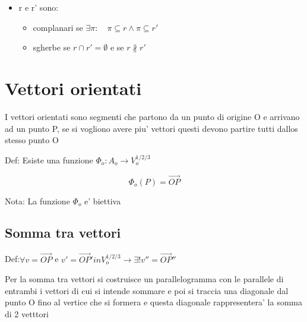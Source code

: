 \documentclass{article}
\begin{document}
\begin{itemize}
\begin{itemize}
\begin{itemize}
		            \end{itemize}
		      \item r e r' sono:
		            \begin{itemize}
			            \item complanari se $\exists \pi: \quad \pi \subseteq r \land \pi \subseteq r'$
			            \item sgherbe se $r \cap r' = \emptyset$ e se $r \nparallel r'$
		            \end{itemize}
	      \end{itemize}
\end{itemize}

\section{Vettori orientati}
\begin{flushleft}
	I vettori orientati sono segmenti che partono da un punto di origine O e arrivano ad un punto P, se si vogliono avere piu' vettori
	questi devono partire tutti dallos stesso punto O
\end{flushleft}
\begin{flushleft}
	Def: Esiste una funzione $\Phi_o : A_o \rightarrow V_o^{1/2/3}$
\end{flushleft}
\begin{equation*}
	\Phi_o(P)=\overrightarrow{OP}
\end{equation*}
\begin{flushleft}
	Nota: La funzione $\Phi_o$ e' biettiva
\end{flushleft}
\subsection{Somma tra vettori}
\begin{flushleft}
	Def:$\forall v = \overrightarrow{OP}$ e $v' = \overrightarrow{OP}' in V_o^{1/2/3} \to \exists ! v''=\overrightarrow{OP}''$
\end{flushleft}
\begin{flushleft}
	Per la somma tra vettori si costruisce un parallelogramma con le parallele di entrambi i vettori di cui si intende sommare
	e poi si traccia una diagonale dal punto O fino al vertice che si formera e questa diagonale rappresentera' la somma di 2 vetttori
\end{flushleft}
\end{document}
